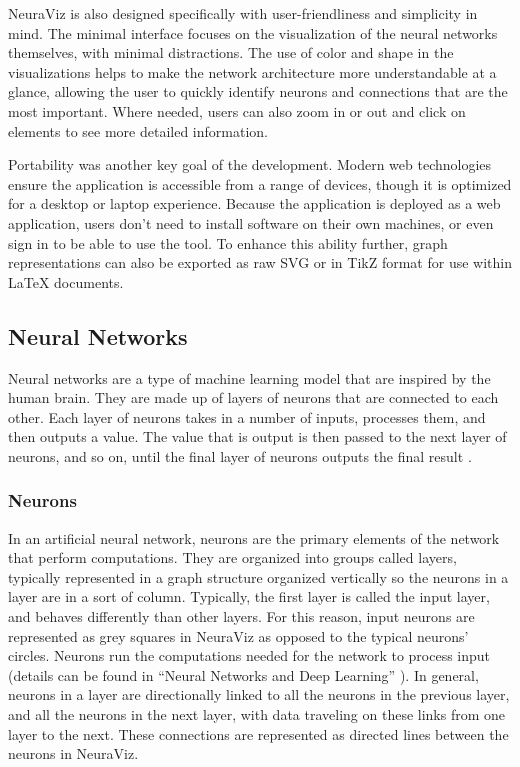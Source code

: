 NeuraViz is also designed specifically with user-friendliness and simplicity in mind. The minimal interface focuses on the visualization of the neural networks themselves, with minimal distractions. The use of color and shape in the visualizations helps to make the network architecture more understandable at a glance, allowing the user to quickly identify neurons and connections that are the most important. Where needed, users can also zoom in or out and click on elements to see more detailed information.

Portability was another key goal of the development. Modern web technologies ensure the application is accessible from a range of devices, though it is optimized for a desktop or laptop experience. Because the application is deployed as a web application, users don't need to install software on their own machines, or even sign in to be able to use the tool. To enhance this ability further, graph representations can also be exported as raw SVG or in TikZ \cite{tikz} format for use within \LaTeX{} documents. 

\subsection{Neural Networks} \label{sec:neural_networks}
Neural networks are a type of machine learning model that are inspired by the human brain. They are made up of layers of neurons that are connected to each other. Each layer of neurons takes in a number of inputs, processes them, and then outputs a value. The value that is output is then passed to the next layer of neurons, and so on, until the final layer of neurons outputs the final result \cite{neuralnetworksanddeeplearning}.

\subsubsection{Neurons}
In an artificial neural network, neurons are the primary elements of the network that perform computations. They are organized into groups called layers, typically represented in a graph structure organized vertically so the neurons in a layer are in a sort of column. Typically, the first layer is called the input layer, and behaves differently than other layers. For this reason, input neurons are represented as grey squares in NeuraViz as opposed to the typical neurons' circles. Neurons run the computations needed for the network to process input (details can be found in ``Neural Networks and Deep Learning'' \cite{neuralnetworksanddeeplearning}). In general, neurons in a layer are directionally linked to all the neurons in the previous layer, and all the neurons in the next layer, with data traveling on these links from one layer to the next. These connections are represented as directed lines between the neurons in NeuraViz.

